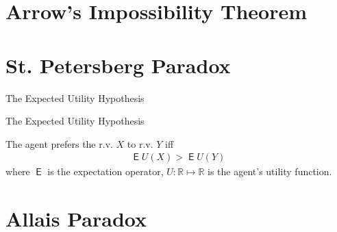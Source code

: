 \documentclass[10pt]{beamer}
\DeclareMathOperator\expc{\mathsf{E}}
\newcommand{\RR}{\mathbb R}
\begin{document}
\section{Arrow's Impossibility Theorem}

\begin{frame}

\end{frame}

\section{St. Petersberg Paradox}

\begin{frame}{The Expected Utility Hypothesis}
\end{frame}

\begin{frame}{The Expected Utility Hypothesis}
  \begin{definition}
    The agent prefers the r.v. $X$ to r.v. $Y$ iff
    \begin{align*}
      \expc U(X) > \expc U(Y)
    \end{align*}
    where $\expc$ is the expectation operator, $U:\RR\mapsto\RR$ is the agent's utility function.
  \end{definition}
\end{frame}

\section{Allais Paradox}
\end{document}
